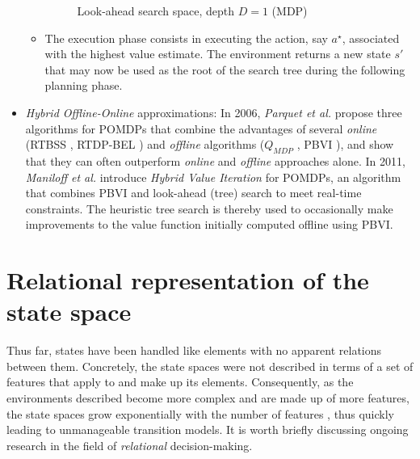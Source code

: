 \begin{itemize}
\begin{itemize}
\begin{figure}[h]
  \caption{Look-ahead search space, depth $D = 1$ (MDP)}
  \label{fig:tree}
\end{figure}
\item The execution phase consists in executing the action, say $a^{\star}$, associated with the highest value estimate. The environment returns a new state $s'$ that may now be used as the root of the search tree during the following planning phase.
    \end{itemize}
    
    \item \textit{Hybrid Offline-Online} approximations: In 2006, \textit{Parquet et al.} \cite{articlepomh} propose three algorithms for POMDPs that combine the advantages of several \textit{online} (RTBSS \cite{rtbss}, RTDP-BEL \cite{rtdpbel}) and \textit{offline} algorithms ($Q_{MDP}$ \cite{qmdp}, PBVI \cite{Pineau-2003-8730}), and show that they can often outperform \textit{online} and \textit{offline} approaches alone. In 2011, \textit{Maniloff et al.} \cite{maniloff} introduce \textit{Hybrid Value Iteration} for POMDPs, an algorithm that combines PBVI and look-ahead (tree) search to meet real-time constraints. The heuristic tree search is thereby used to occasionally make improvements to the value function initially computed offline using PBVI.
\end{itemize}


\section{Relational representation of the state space}
\label{sec:repstat}
Thus far, states have been handled like elements with no apparent relations between them. Concretely, the state spaces were not described in terms of a set of features that apply to and make up its elements. Consequently, as the environments described become more complex and are made up of more features, the state spaces grow exponentially with the number of features \cite{masbook}, thus quickly leading to unmanageable transition models. It is worth briefly discussing ongoing research in the field of \textit{relational} decision-making.


